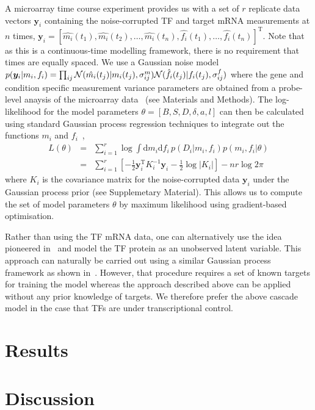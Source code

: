 \documentclass{pnastwo}
\begin{document}
\begin{article}
A microarray time course experiment provides us with a set of $r$
replicate data vectors $\bm y_i$ containing the noise-corrupted TF and target mRNA
measurements at $n$ times,
$\bm y_i=[\hat{m_i}(t_1),\hat{m_i}(t_2),\ldots,\hat{m_i}(t_n),\hat{f_i}(t_1),\ldots,\hat{f_i}(t_n)]^\mathrm{T}$. Note
that as this is a continuous-time modelling framework, there is no
requirement that times are equally spaced. We use a Gaussian noise model
$p(\bm y_i|m_i,f_i)=\prod_{ij}{\cal
  N}(\hat{m_i}(t_j)|m_i(t_j),\sigma^m_{ij}){\cal
  N}(\hat{f_i}(t_j)|f_i(t_j),\sigma^f_{ij})$ where the gene and condition
specific measurement variance parameters are obtained from a probe-level anaysis of the microarray data~\cite{Liu2005,Pearson2009} (see
Materials and Methods). The log-likelihood for the model parameters
$\theta=[B,S,D,\delta,a,l]$ can then be calculated using standard Gaussian process regression
techniques to integrate out the functions $m_i$ and $f_i$~\cite{Rasmussen2006},
\begin{eqnarray*}
L(\theta) & = & \sum_{i=1}^r \log \!\int \!\mathrm{d}m_i\mathrm{d}f_i\,
p(D_i|m_i,f_i)p(m_i,f_i|\theta)  \\
& = & \sum_{i=1}^r \left[-\frac{1}{2}\bm y_i^\mathrm{T} K_i^{-1} \bm y_i -
\frac{1}{2}\log|K_i|\right] -nr\log 2\pi
\end{eqnarray*}
where $K_i$ is the covariance matrix for the
noise-corrupted data $\bm y_i$ under the Gaussian process prior (see Supplemetary
Material). This allows us to compute the set of model parameters $\theta$ by maximum
likelihood using gradient-based optimisation. 

Rather than using the TF mRNA data, one can alternatively use the idea pioneered
in~\cite{Barenco2006a} and model the TF protein as an unobserved
latent variable. This approach can naturally be carried out using a
similar Gaussian process framework as shown in~\cite{Gao2008}. However, that procedure requires a set of known
targets for training the model whereas the approach described above
can be applied without any prior knowledge of targets. We therefore
prefer the above cascade model in the case that TFs are under
transcriptional control. 

\section{Results}

\section{Discussion}


\end{article}
\end{document}
